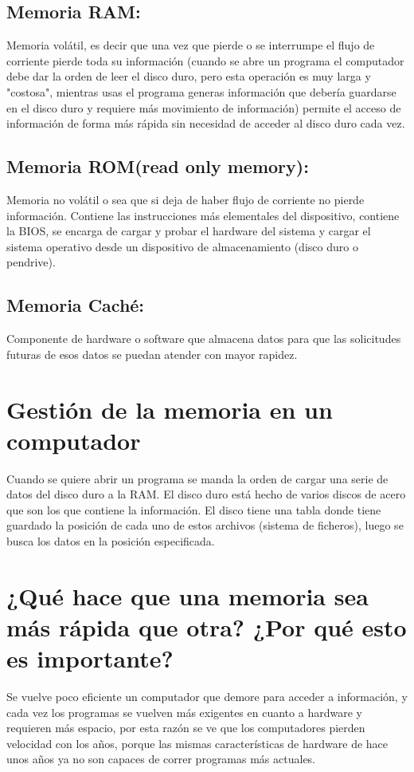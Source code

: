 \documentclass{article}
\begin{document}
\subsection{Memoria RAM:}
Memoria volátil, es decir que una vez que pierde o se interrumpe el flujo de corriente pierde toda su información (cuando se abre un programa el computador debe dar la orden de leer el disco duro, pero esta operación es muy larga y "costosa", mientras usas el programa generas información que debería guardarse en el disco duro y requiere más movimiento de información) permite el acceso de información de forma más rápida sin necesidad de acceder al disco duro cada vez.

\subsection{Memoria ROM(read only memory):} 
Memoria no volátil o sea que si deja de haber flujo de corriente no pierde información. Contiene las instrucciones más elementales del dispositivo, contiene la BIOS, se encarga de cargar y probar el hardware del sistema y cargar el sistema operativo desde un dispositivo de almacenamiento (disco duro o pendrive).

\subsection{Memoria Caché: } 
Componente de hardware o software que almacena datos para que las solicitudes futuras de esos datos se puedan atender con mayor rapidez.

\section{Gestión de la memoria en un computador}
Cuando se quiere abrir un programa se manda la orden de cargar una serie de datos del disco duro a la RAM. El disco duro está hecho de varios discos de acero que son los que contiene la información. El disco tiene una tabla donde tiene guardado la posición de cada uno de estos archivos (sistema de ficheros), luego se busca los datos en la posición especificada.

\section{¿Qué hace que una memoria sea más rápida que otra? ¿Por qué esto es importante?}
Se vuelve poco eficiente un computador que demore para acceder a información, y cada vez los programas se vuelven más exigentes en cuanto a hardware y requieren más espacio, por esta razón se ve que los computadores pierden velocidad con los años, porque las mismas características de hardware de hace unos años ya no son capaces de correr programas más actuales.
\end{document}
